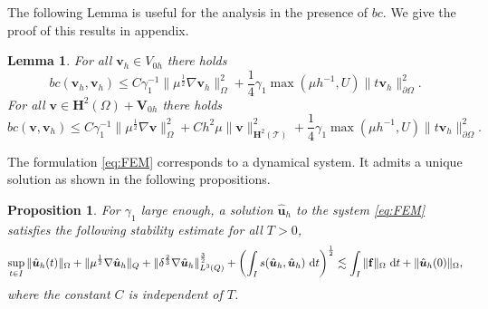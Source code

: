 \documentclass[10pt]{amsart}
\numberwithin{equation}{section}
\newtheorem{lemma}[theorem]{Lemma}
\newtheorem{proposition}[theorem]{Proposition}
\theoremstyle{definition}
\theoremstyle{remark}
\renewcommand{\(}{\bigl(}
\renewcommand{\)}{\bigr)}
\newcommand{\bld}[1]{\boldsymbol{#1}}
\newcommand{\bv}{\bld{v}}
\newcommand{\bhu}{\hat{\bld{u}}}
\newcommand{\bV}{\bld{V}}
\newcommand{\bH}{\bld{H}}
\begin{document}
 The following Lemma is useful for
the analysis in the presence of $bc$. We give the proof of this
results in appendix.
\begin{lemma}\label{lem:bc_stab}
For all $\bv_h \in V_{0h}$ there holds
\[
bc(\bv_h, \bv_h) \leq C  \gamma_1^{-1} \|\mu^{\frac12} \nabla
\bv_h\|^2_{\Omega}+ \frac14 \gamma_1\max(\mu h^{-1},U) \|t \bv_h\|^2_{\partial
  \Omega}.
\]
For all $\bv \in \bH^2(\Omega) + \bV_{0h}$ there holds
\[
bc(\bv, \bv_h) \leq  C\gamma_1^{-1} \|\mu^{\frac12} \nabla
\bv\|^2_{\Omega} + C h^2 \mu \|\bv
\|^2_{\bH^2(\mathcal{T})}  + \frac14 \gamma_1 \max(\mu h^{-1},U) \|t \bv_h\|^2_{\partial
  \Omega}.
\]
\end{lemma}
The formulation
\eqref{eq:FEM} corresponds to a dynamical system. It admits a unique
solution as shown in the following propositions.
\begin{proposition}\label{prop:apriori}
For $\gamma_1$ large enough, a solution $\bhu_h $ to the system \eqref{eq:FEM}  satisfies the following
stability estimate for all $T>0$,
\begin{equation}
\sup_{t \in I} \|\bhu_h(t)\|_\Omega + \|\mu^{\frac12} \nabla
\bhu_h\|_{Q}+ \|\delta^{\frac23}\nabla
\bhu_h\|^{\frac32}_{L^3(Q)}+\left(\int_I s(\bhu_h,\bhu_h) ~\mbox{d}t\right)^{\frac12}
\lesssim \int_I \|{\bf f }\|_\Omega ~\mbox{d}t+\|\bhu_h(0) \|_\Omega,
\end{equation}
where the constant $C$ is independent of $T$.
\end{proposition}
\end{document}

